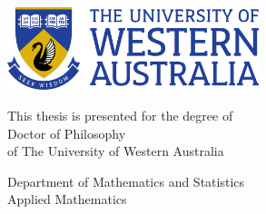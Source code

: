 \begin{titlepage}

\centering

\vspace*{6em}

{\Huge\bfseries
  \scalebox{0.97}{\titlefirstline} \\
  \scalebox{0.93}{\titlesecondline} \\
}

\vfill

{\Huge
  \scalebox{0.95}{\theauthor} \\
}
{\huge
   \\
}

\vfill

\includegraphics[width=0.55\textwidth]{frontmatter/uwa-logo}

\vspace{2.5em}

{\LARGE
  This thesis is presented for the degree of \\
  Doctor of Philosophy \\
  of The University of Western Australia \\
}

\vspace{2em}

{\Large
  Department of Mathematics and Statistics \\
  Applied Mathematics \\
}

\vspace{1.5em}

{\huge
  \theyear \\
}

\vspace{3em}

\end{titlepage}
